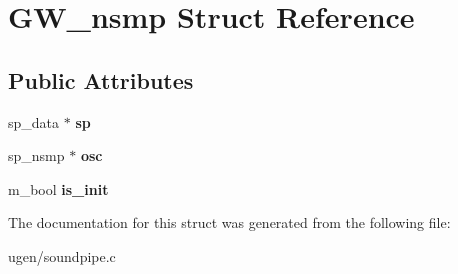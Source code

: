 \hypertarget{structGW__nsmp}{}\section{G\+W\+\_\+nsmp Struct Reference}
\label{structGW__nsmp}
\subsection*{Public Attributes}
\begin{DoxyCompactItemize}
\item 
\hypertarget{structGW__nsmp_a0efac078b9413a72b44f26557cc9946a}{}\label{structGW__nsmp_a0efac078b9413a72b44f26557cc9946a} 
sp\+\_\+data $\ast$ {\bfseries sp}
\item 
\hypertarget{structGW__nsmp_a5cbe7d628924485f254cc6f988cc0f2f}{}\label{structGW__nsmp_a5cbe7d628924485f254cc6f988cc0f2f} 
sp\+\_\+nsmp $\ast$ {\bfseries osc}
\item 
\hypertarget{structGW__nsmp_a465518a32d7035031e4d806ec05c00b4}{}\label{structGW__nsmp_a465518a32d7035031e4d806ec05c00b4} 
m\+\_\+bool {\bfseries is\+\_\+init}
\end{DoxyCompactItemize}


The documentation for this struct was generated from the following file\+:\begin{DoxyCompactItemize}
\item 
ugen/soundpipe.\+c\end{DoxyCompactItemize}
